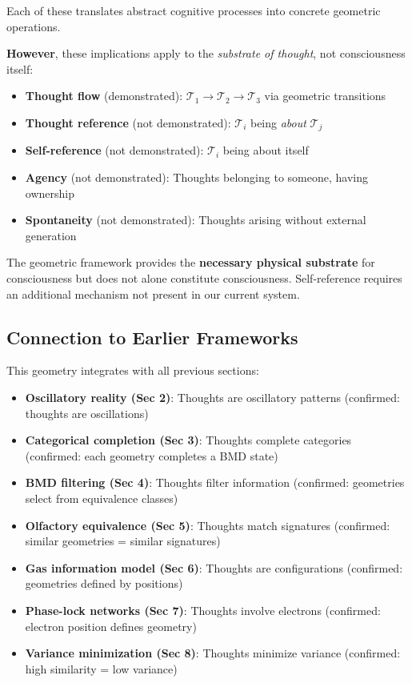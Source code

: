 \documentclass[11pt]{article}
\theoremstyle{remark}
\begin{document}
Each of these translates abstract cognitive processes into concrete geometric operations.

\textbf{However}, these implications apply to the \textit{substrate of thought}, not consciousness itself:

\begin{itemize}
\item \textbf{Thought flow} (demonstrated): $\mathcal{T}_1 \to \mathcal{T}_2 \to \mathcal{T}_3$ via geometric transitions
\item \textbf{Thought reference} (not demonstrated): $\mathcal{T}_i$ being \textit{about} $\mathcal{T}_j$
\item \textbf{Self-reference} (not demonstrated): $\mathcal{T}_i$ being about itself
\item \textbf{Agency} (not demonstrated): Thoughts belonging to someone, having ownership
\item \textbf{Spontaneity} (not demonstrated): Thoughts arising without external generation
\end{itemize}

The geometric framework provides the \textbf{necessary physical substrate} for consciousness but does not alone constitute consciousness. Self-reference requires an additional mechanism not present in our current system.

\subsection{Connection to Earlier Frameworks}

This geometry integrates with all previous sections:

\begin{itemize}
\item \textbf{Oscillatory reality (Sec 2)}: Thoughts are oscillatory patterns (confirmed: thoughts are  oscillations)
\item \textbf{Categorical completion (Sec 3)}: Thoughts complete categories (confirmed: each geometry completes a BMD state)
\item \textbf{BMD filtering (Sec 4)}: Thoughts filter information (confirmed: geometries select from equivalence classes)
\item \textbf{Olfactory equivalence (Sec 5)}: Thoughts match signatures (confirmed: similar geometries = similar signatures)
\item \textbf{Gas information model (Sec 6)}: Thoughts are  configurations (confirmed: geometries defined by  positions)
\item \textbf{Phase-lock networks (Sec 7)}: Thoughts involve electrons (confirmed: electron position defines geometry)
\item \textbf{Variance minimization (Sec 8)}: Thoughts minimize variance (confirmed: high similarity = low variance)
\end{itemize}
\end{document}
